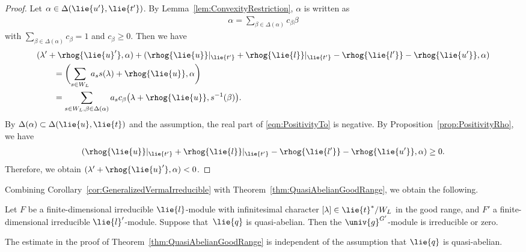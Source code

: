 \begin{proof}
	Let $\alpha \in \Delta(\lie{u'}, \lie{t'})$.
	By Lemma~\ref{lem:ConvexityRestriction}, $\alpha$ is written as
	\begin{align*}
		\alpha = \sum_{\beta \in \Delta(\alpha)} c_{\beta} \beta
	\end{align*}
	with $\sum_{\beta \in \Delta(\alpha)}c_{\beta} = 1$ and $c_{\beta} \geq 0$.
	Then we have
	\begin{align}
		&(\lambda'+\rhog{\lie{u}'}, \alpha) + (\rhog{\lie{u}}|_{\lie{t'}} + \rhog{\lie{l}}|_{\lie{t'}} - \rhog{\lie{l'}} - \rhog{\lie{u'}}, \alpha) \nonumber \\
		&\qquad{}=\biggl(\sum_{s \in W_L} a_s s(\lambda) + \rhog{\lie{u}}, \alpha\biggr) \nonumber \\
		&\qquad{}=\sum_{s \in W_L, \beta \in \Delta(\alpha)}a_s c_{\beta}\bigl(\lambda + \rhog{\lie{u}}, s^{-1}(\beta)\bigr). \label{eqn:PositivityTo}
	\end{align}
	By $\Delta(\alpha)\subset \Delta(\lie{u}, \lie{t})$ and the assumption, the real part of \eqref{eqn:PositivityTo} is negative.
	By Proposition~\ref{prop:PositivityRho}, we have
	\begin{align*}
		(\rhog{\lie{u}}|_{\lie{t'}} + \rhog{\lie{l}}|_{\lie{t'}} - \rhog{\lie{l'}} - \rhog{\lie{u'}}, \alpha) \geq 0.
	\end{align*}
	Therefore, we obtain $(\lambda'+\rhog{\lie{u}'}, \alpha) < 0$.
\end{proof}

Combining Corollary~\ref{cor:GeneralizedVermaIrreducible} with Theorem~\ref{thm:QuasiAbelianGoodRange}, we obtain the following.

\begin{Corollary}\label{cor:IrreducibleVermaQuasiAbelian}
	Let $F$ be a finite-dimensional irreducible $\lie{l}$-module with infinitesimal character $[\lambda] \in \lie{t}^*/W_L$
	in the good range, and $F'$ a finite-dimensional irreducible $\lie{l}'$-module.
	Suppose that~$\lie{q}$ is quasi-abelian.
	Then the $\univ{g}^{G'}$-module  is irreducible or zero.
\end{Corollary}

The estimate in the proof of Theorem~\ref{thm:QuasiAbelianGoodRange} is independent of the assumption that $\lie{q}$ is quasi-abelian.
